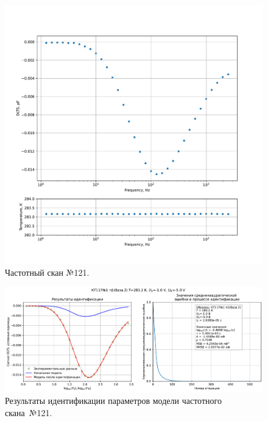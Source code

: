\begin{figure}[!ht]
    \centering
    \includegraphics[width=1\textwidth]{../plots/КТ117№1_п1(база 2)_2500Гц-1Гц_1пФ_+10С_-1В-5В_200мВ_20мкс_шаг_0,1.pdf}
    \caption{Частотный скан №121.}
    \label{pic:frequency_scan_121}
\end{figure}

\begin{figure}[!ht]
    \centering
    \includegraphics[width=1\textwidth]{../plots/КТ117№1_п1(база 2)_2500Гц-1Гц_1пФ_+10С_-1В-5В_200мВ_20мкс_шаг_0,1_model.pdf}
    \caption{Результаты идентификации параметров модели частотного скана~№121.}
    \label{pic:frequency_scan_model121}
\end{figure}

\pagebreak



